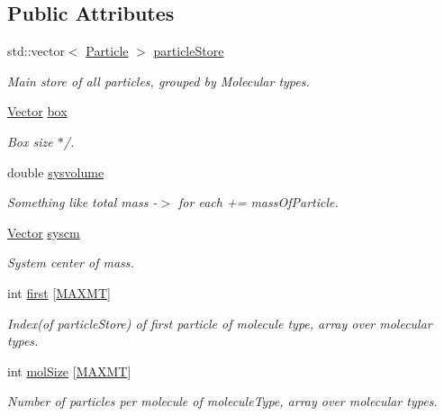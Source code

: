 \subsection*{Public Attributes}
\begin{DoxyCompactItemize}
\item 
std\+::vector$<$ \hyperlink{class_particle}{Particle} $>$ \hyperlink{class_conf_a338d1f9d722924ef7bdf230cec6d8713}{particle\+Store}
\begin{DoxyCompactList}\small\item\em Main store of all particles, grouped by Molecular types. \end{DoxyCompactList}\item 
\hyperlink{class_vector}{Vector} \hyperlink{class_conf_a98e73199812404fd886619f90f0b26e7}{box}
\begin{DoxyCompactList}\small\item\em Box size $\ast$/. \end{DoxyCompactList}\item 
double \hyperlink{class_conf_a0591e720e4f06449a7d37a8e3135ddb1}{sysvolume}
\begin{DoxyCompactList}\small\item\em Something like total mass -\/$>$ for each += mass\+Of\+Particle. \end{DoxyCompactList}\item 
\hyperlink{class_vector}{Vector} \hyperlink{class_conf_a8d27bcc5bf535c39c7c0f17a078448d9}{syscm}
\begin{DoxyCompactList}\small\item\em System center of mass. \end{DoxyCompactList}\item 
int \hyperlink{class_conf_a907de4d9eb23d6480a16007c5087382c}{first} \mbox{[}\hyperlink{macros_8h_ad002a98462c90c52983b122ab9e2059a}{M\+A\+X\+M\+T}\mbox{]}
\begin{DoxyCompactList}\small\item\em Index(of particle\+Store) of first particle of molecule type, array over molecular types. \end{DoxyCompactList}\item 
int \hyperlink{class_conf_ae8941c30c3bdb0bb5bd33db013a60993}{mol\+Size} \mbox{[}\hyperlink{macros_8h_ad002a98462c90c52983b122ab9e2059a}{M\+A\+X\+M\+T}\mbox{]}
\begin{DoxyCompactList}\small\item\em Number of particles per molecule of molecule\+Type, array over molecular types. \end{DoxyCompactList}\item 

\end{DoxyCompactItemize}
